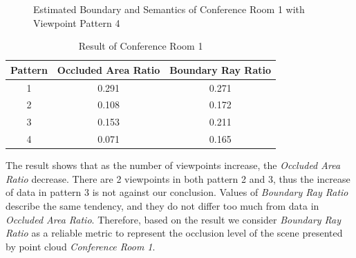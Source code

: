 \documentclass[11pt, a4paper,oneside,chapterprefix=false]{scrbook}
\begin{document}
\begin{figure}[H]
    \centering
      \label{fig:conf1 b 200 6} \hfill
     \label{fig:conf1 s 200 6}
    \caption{Estimated Boundary and Semantics of Conference Room 1 with Viewpoint Pattern 4}
    \label{fig:conf1 6}
\end{figure}

\begin{table}[H]
    \centering
    \begin{tabular}{|c|c|c|}
        \hline
        \textbf{Pattern} & \textbf{Occluded Area Ratio} & \textbf{Boundary Ray Ratio} \\
        \hline
        1 & 0.291 & 0.271 \\
        2 & 0.108 & 0.172 \\
		3 & 0.153 & 0.211 \\
		4 & 0.071 & 0.165 \\
        \hline
    \end{tabular}
    \caption{Result of Conference Room 1}
    \label{tab:result of conference room 1}
\end{table}

The result shows that as the number of viewpoints increase, the \emph{Occluded Area Ratio} decrease. There are 2 viewpoints in both pattern 2 and 3, thus the increase of data in pattern 3 is not against our conclusion. Values of \emph{Boundary Ray Ratio} describe the same tendency, and they do not differ too much from data in \emph{Occluded Area Ratio}. Therefore, based on the result we consider \emph{Boundary Ray Ratio} as a reliable metric to represent the occlusion level of the scene presented by point cloud \emph{Conference Room 1}.       
\end{document}
